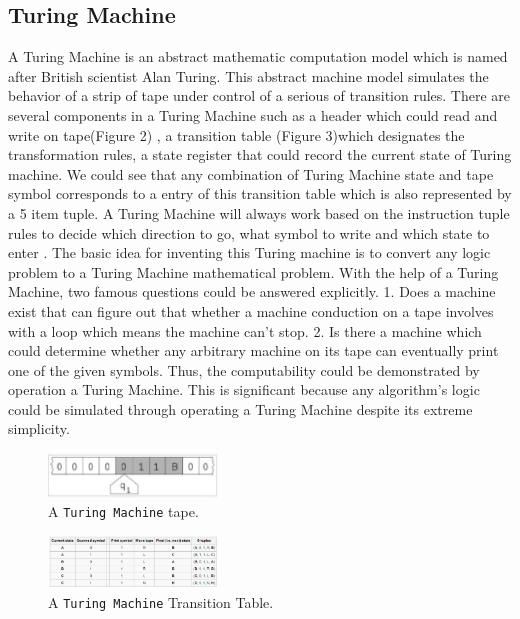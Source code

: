 \documentclass{sig-alternate-05-2015}
\begin{document}
\subsection{Turing Machine}
A Turing Machine is an abstract mathematic computation model which is named after British scientist Alan Turing. This abstract machine model simulates the behavior of a strip of tape under control of a serious of transition rules. There are several components in a Turing Machine such as a header which could read and write on tape(Figure 2) , a transition table (Figure 3)which designates the transformation rules, a state register that could record the current state of Turing machine. We could see that any combination of Turing Machine state and tape symbol corresponds to a entry of this transition table which is also represented by a 5 item tuple. A Turing Machine will always work based on the instruction tuple rules to decide which direction to go, what symbol to write and which state to enter . The basic idea for inventing this Turing machine is to convert any logic problem to a Turing Machine mathematical problem. With the help of a Turing Machine, two famous questions could be answered explicitly. 1. Does a machine exist that can figure out that whether a machine conduction on a tape involves with a loop which means the machine can't stop. 2. Is there a machine which could determine whether any arbitrary machine on its tape can eventually print one of the given symbols. Thus, the computability could be demonstrated by operation a Turing Machine. This is significant because any algorithm's logic could be simulated through operating a Turing Machine despite its extreme simplicity.
\begin{figure}
\centering
\includegraphics[width=0.4\textwidth]{tape}
\caption{ A \texttt{Turing Machine} tape.}
\end{figure}

\begin{figure}
\centering
\includegraphics[width=0.4\textwidth]{TM_Table}
\caption{ A \texttt{Turing Machine} Transition Table.}
\end{figure}
\end{document}
